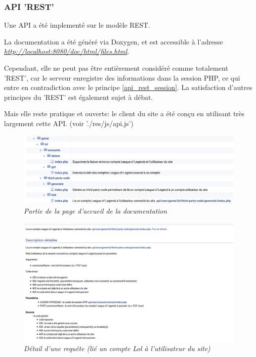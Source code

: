 \documentclass[10pt]{article}
\begin{document}
      \newpage
      \subsubsection{API 'REST'}
	Une API a été implementé sur le modèle REST.
	
	La documentation a été généré via Doxygen, et est accessible à l'adresse \href{http://localhost:8080/doc/html/files.html}{\textit{http://localhost:8080/doc/html/files.html}}.
	
	Cependant, elle ne peut pas être entièrement considéré comme totalement 'REST', car le serveur enregistre des informations dans la session PHP,
	ce qui entre en contradiction avec le principe \ref{api_rest_session}. La satisfaction d'autres principes du 'REST' est également sujet à débat.
	
	Mais elle reste pratique et ouverte: le client du site a été conçu en utilisant très largement cette API. (voir './res/js/api.js')

      \begin{figure}[H]
	\begin{center}
	  \includegraphics[width=14cm,keepaspectratio]{./images/api.png}
	\end{center}
	\caption{\textit{Partie de la page d'accueil de la documentation}}
	\label{api}
      \end{figure}
      
      \begin{figure}[H]
	\begin{center}
	  \includegraphics[width=14cm,keepaspectratio]{./images/link_account.png}
	\end{center}
	\caption{\textit{Détail d'une requête (lié un compte Lol à l'utilisateur du site)}}
	\label{link_account}
      \end{figure}
\end{document}
